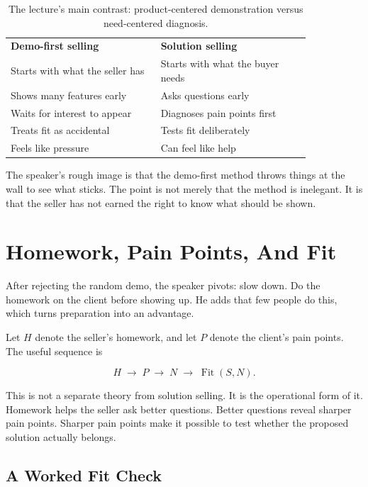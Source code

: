 \begin{table}
\centering
\begin{tabular}{p{0.42\linewidth}p{0.42\linewidth}}
\textbf{Demo-first selling} & \textbf{Solution selling} \\
Starts with what the seller has & Starts with what the buyer needs \\
Shows many features early & Asks questions early \\
Waits for interest to appear & Diagnoses pain points first \\
Treats fit as accidental & Tests fit deliberately \\
Feels like pressure & Can feel like help \\
\end{tabular}
\caption{The lecture's main contrast: product-centered demonstration versus need-centered diagnosis.}
\end{table}

The speaker's rough image is that the demo-first method throws things at the wall to see what sticks. The point is not merely that the method is inelegant. It is that the seller has not earned the right to know what should be shown.

\section{Homework, Pain Points, And Fit}

After rejecting the random demo, the speaker pivots: slow down. Do the homework on the client before showing up. He adds that few people do this, which turns preparation into an advantage.

Let \(H\) denote the seller's homework, and let \(P\) denote the client's pain points. The useful sequence is

\begin{equation}
H
\;\longrightarrow\;
P
\;\longrightarrow\;
N
\;\longrightarrow\;
\operatorname{Fit}(S,N).
\end{equation}

This is not a separate theory from solution selling. It is the operational form of it. Homework helps the seller ask better questions. Better questions reveal sharper pain points. Sharper pain points make it possible to test whether the proposed solution actually belongs.

\subsection{A Worked Fit Check}

